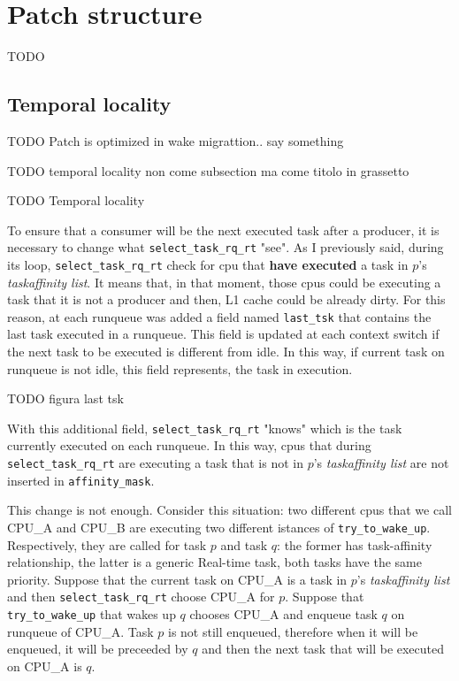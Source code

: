 \section{Patch structure}

TODO

\subsection{Temporal locality}

TODO Patch is optimized in wake migrattion.. say something

TODO temporal locality non come subsection ma come titolo in grassetto

TODO Temporal locality

To ensure that a consumer will be the next executed task after a producer, it is necessary to change what \texttt{select\_task\_rq\_rt} "see". As I 
previously said, during its loop, \texttt{select\_task\_rq\_rt} check for cpu that \textbf{have executed} a task in $p$'s \textit{taskaffinity list}. 
It means that, in that moment, those cpus could be executing a task that it is not a producer and then, L1 cache could be already dirty. For this reason, 
at each runqueue was added a field named \texttt{last\_tsk} that contains the last task executed in a runqueue. This field is updated at each context switch 
if the next task to be executed is different from idle. In this way, if current task on runqueue is not idle, this field represents, the task in execution. 

TODO figura last tsk

With this additional field, \texttt{select\_task\_rq\_rt} "knows" which is the task currently executed on each runqueue. In this way, cpus that during 
\texttt{select\_task\_rq\_rt} are executing a task that is not in $p$'s \textit{taskaffinity list} are not inserted in \texttt{affinity\_mask}.

This change is not enough. Consider this situation: two different cpus that we call CPU\_A and CPU\_B are executing two different istances of 
\texttt{try\_to\_wake\_up}. Respectively, they are called for task $p$ and task $q$: the former has task-affinity relationship, the latter is a generic 
Real-time task, both tasks have the same priority. Suppose that the current task on CPU\_A is a task in $p$'s \textit{taskaffinity list} and then 
\texttt{select\_task\_rq\_rt} choose CPU\_A for $p$. Suppose that \texttt{try\_to\_wake\_up} that wakes up $q$ chooses CPU\_A and enqueue task $q$ on 
runqueue of CPU\_A. Task $p$ is not still enqueued, therefore when it will be enqueued, it will be preceeded by $q$ and then the next task that will
be executed on CPU\_A is $q$.

